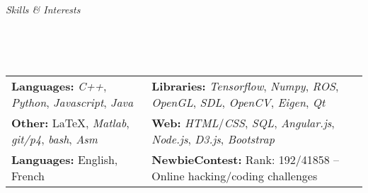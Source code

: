 \documentclass[a4paper, 12pt]{article}
\newcommand{\marginline}{-0.3cm}
\newcommand{\marginbeforesection}{0.35cm}
\newcommand{\marginbeforemisc}{-0.75cm}
\newcommand{\linewidthperso}{0.02cm}
\newcommand{\stylesection}[1]{
  \vspace{\marginbeforesection}
  \begin{normalsize}\textit{#1}\end{normalsize}
  \vspace{\marginline}\\
  \noindent\makebox[\linewidth]{\rule{\textwidth}{\linewidthperso}}

}
\begin{document}
\begin{footnotesize}
\stylesection{Skills \& Interests}
~\\
\vspace{\marginbeforemisc}

\noindent\begin{tabular}{@{}p{7.15cm}p{12cm}}
  \textbf{Languages:} \textit{C++}, \textit{Python}, \textit{Javascript}, \textit{Java} & \textbf{Libraries:} \textit{Tensorflow}, \textit{Numpy}, \textit{ROS}, \textit{OpenGL}, \textit{SDL}, \textit{OpenCV}, \textit{Eigen}, \textit{Qt}\\
  \textbf{Other:} \LaTeX, \textit{Matlab}, \textit{git/p4}, \textit{bash}, \textit{Asm} & \textbf{Web:} \textit{HTML}/\textit{CSS}, \textit{SQL}, \textit{Angular.js}, \textit{Node.js}, \textit{D3.js}, \textit{Bootstrap}\\
  \textbf{Languages:} English, French & \textbf{NewbieContest:} Rank: 192/41858 -- Online hacking/coding challenges\\
\end{tabular}

\end{footnotesize}
\end{document}
